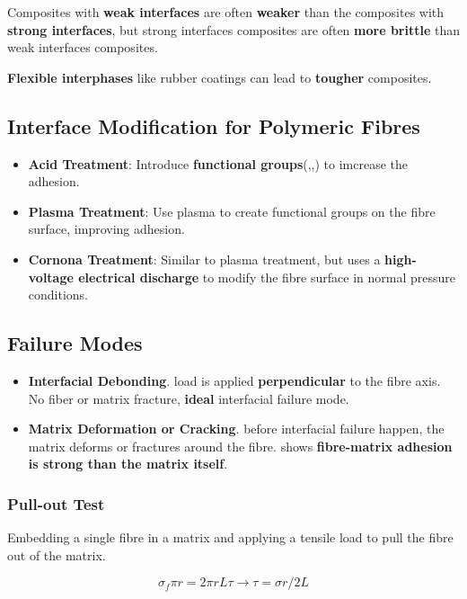\documentclass{NoteThesis/note-thesis}
\begin{document}
Composites with \textbf{weak interfaces} are often \textbf{weaker} than the composites with \textbf{strong interfaces}, but strong interfaces composites are often \textbf{more brittle} than weak interfaces composites.

\textbf{Flexible interphases} like rubber coatings can lead to \textbf{tougher} composites.

\subsection{Interface Modification for Polymeric Fibres}

\begin{itemize}
    \item \textbf{Acid Treatment}: Introduce \textbf{functional groups}(,,) to imcrease the adhesion.
    \item  \textbf{Plasma Treatment}: Use plasma to create functional groups on the fibre surface, improving adhesion.
    \item \textbf{Cornona Treatment}: Similar to plasma treatment, but uses a \textbf{high-voltage electrical discharge} to modify the fibre surface in normal pressure conditions.
\end{itemize}

\subsection{Failure Modes}

\begin{itemize}
    \item \textbf{Interfacial Debonding}. load is applied \textbf{perpendicular} to the fibre axis. No fiber or matrix fracture, \textbf{ideal} interfacial failure mode.
    \item \textbf{Matrix Deformation or Cracking}. before interfacial failure happen, the matrix deforms or fractures around the fibre. shows \textbf{fibre-matrix adhesion is strong than the matrix itself}.
\end{itemize}

\subsubsection*{Pull-out Test}

Embedding a single fibre in a matrix and applying a tensile load to pull the fibre out of the matrix.

\begin{equation*}
    \sigma_f \pi r = 2 \pi r L \tau \rightarrow \tau = \sigma r / 2L
\end{equation*}
\end{document}
